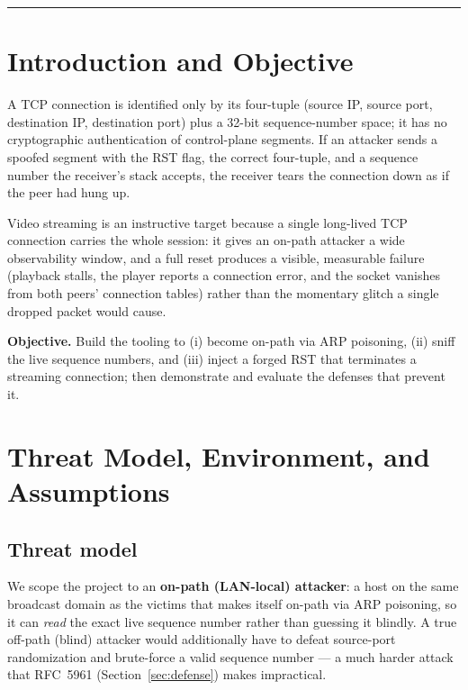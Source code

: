 \documentclass[11pt,a4paper]{article}
\begin{document}
\tableofcontents
\vspace{8pt}\hrule

\section{Introduction and Objective}
A TCP connection is identified only by its four-tuple (source IP, source port,
destination IP, destination port) plus a 32-bit sequence-number space; it has no
cryptographic authentication of control-plane segments. If an attacker sends a
spoofed segment with the RST flag, the correct four-tuple, and a sequence number
the receiver's stack accepts, the receiver tears the connection down as if the
peer had hung up.

Video streaming is an instructive target because a single long-lived TCP
connection carries the whole session: it gives an on-path attacker a wide
observability window, and a full reset produces a visible, measurable failure
(playback stalls, the player reports a connection error, and the socket vanishes
from both peers' connection tables) rather than the momentary glitch a single
dropped packet would cause.

\medskip\noindent\textbf{Objective.} Build the tooling to (i) become on-path via
ARP poisoning, (ii) sniff the live sequence numbers, and (iii) inject a forged
RST that terminates a streaming connection; then demonstrate and evaluate the
defenses that prevent it.

\section{Threat Model, Environment, and Assumptions}
\label{sec:assumptions}

\subsection{Threat model}
We scope the project to an \textbf{on-path (LAN-local) attacker}: a host on the
same broadcast domain as the victims that makes itself on-path via ARP poisoning,
so it can \emph{read} the exact live sequence number rather than guessing it
blindly. A true off-path (blind) attacker would additionally have to defeat
source-port randomization and brute-force a valid sequence number — a much harder
attack that RFC~5961 (Section~\ref{sec:defense}) makes impractical.
\end{document}
